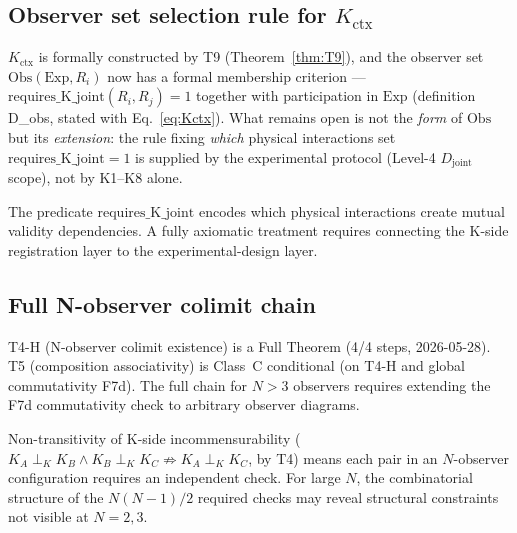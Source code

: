 \documentclass[12pt,a4paper]{article}
\theoremstyle{plain}
\theoremstyle{definition}
\theoremstyle{remark}
\newcommand{\Kctx}{K_{\mathrm{ctx}}}
\begin{document}
\subsection{Observer set selection rule for $\Kctx$}
\label{open:obs}

\begin{description}[leftmargin=0pt]
\item[\textit{Problem.}]
$\Kctx$ is formally constructed by T9 (Theorem~\ref{thm:T9}), and the observer
set $\mathrm{Obs}(\mathrm{Exp}, R_i)$ now has a formal membership criterion ---
$\mathrm{requires\_K\_joint}(R_i, R_j) = 1$ together with participation in
$\mathrm{Exp}$ (definition D\_obs, stated with Eq.~\eqref{eq:Kctx}). What remains open
is not the \emph{form} of $\mathrm{Obs}$ but its \emph{extension}: the rule
fixing \emph{which} physical interactions set
$\mathrm{requires\_K\_joint} = 1$ is supplied by the experimental protocol
(Level-4 $D_{\mathrm{joint}}$ scope), not by K1--K8 alone.

\item[\textit{Why open.}]
The predicate $\mathrm{requires\_K\_joint}$ encodes which physical interactions
create mutual validity dependencies. A fully axiomatic treatment requires
connecting the K-side registration layer to the experimental-design layer.
\end{description}

\subsection{Full N-observer colimit chain}
\label{open:colimit}

\begin{description}[leftmargin=0pt]
\item[\textit{Problem.}]
T4-H (N-observer colimit existence) is a Full Theorem (4/4 steps,
2026-05-28). T5 (composition associativity) is Class~C conditional
(on T4-H and global commutativity F7d). The full chain for $N > 3$
observers requires extending the F7d commutativity check to arbitrary
observer diagrams.

\item[\textit{Why open.}]
Non-transitivity of K-side incommensurability
($K_A \perp_K K_B \wedge K_B \perp_K K_C \not\Rightarrow K_A \perp_K K_C$,
by T4) means each pair in an $N$-observer configuration requires an
independent check. For large $N$, the combinatorial structure of the
$N(N-1)/2$ required checks may reveal structural constraints not visible
at $N=2,3$.
\end{description}
\end{document}
